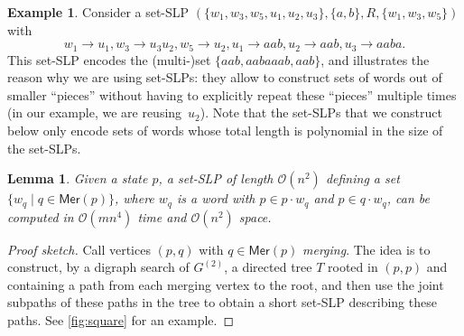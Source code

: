 \documentclass[11pt,a4paper]{amsart}
\newcommand{\OO}{\mathcal{O}}
\newcommand{\Mer}{\mathsf{Mer}}
\theoremstyle{plain}
\newtheorem{lem}[thm]{Lemma}
\theoremstyle{definition}
\newtheorem{exa}[thm]{Example}
\theoremstyle{defC}
\theoremstyle{thmC}
\theoremstyle{plain}
\numberwithin{equation}{section}
\begin{document}
\begin{exa}\label{ex:set-slp}
    Consider a set-SLP $(\{w_1, w_3, w_5, u_1, u_2, u_3\}, \{a, b\}, R, \{w_1, w_3, w_5\})$ with 
\[w_1 \to u_1, w_3 \to u_3 u_2, w_5 \to u_2, 
u_1 \to aab, u_2 \to aab, u_3 \to aaba.\]
This set-SLP encodes the (multi-)set $\{aab, aabaaab, aab\}$, and illustrates the reason why we are using set-SLPs: they allow to construct sets of words out of smaller ``pieces'' without having to explicitly repeat these ``pieces'' multiple times (in our example, we are reusing~$u_2$). Note that the set-SLPs that we construct below only encode sets of words whose total length is polynomial in the size of the set-SLPs.
\end{exa}


\begin{lem}
\label{lemma:fast-pair}
    Given a state $p$, a set-SLP of length $\OO(n^2)$ defining a set $\{w_q \mid q \in \Mer(p)\}$, where $w_q$ is a word with $p \in p \cdot w_q$ and $p \in q \cdot w_q$, can be computed in $\OO(mn^4)$ time and $\OO(n^2)$ space.
\end{lem}
\begin{proof}[Proof sketch]
Call vertices $(p, q)$ with $q \in \Mer(p)$ \emph{merging}. The idea is to construct, by a digraph search of $G^{(2)}$, a directed tree $T$ rooted in $(p, p)$  and containing a path from each merging vertex to the root, and then use the joint subpaths of these paths in the tree to obtain a short set-SLP describing these paths. See \autoref{fig:square} for an example.
\end{proof}
\end{document}
